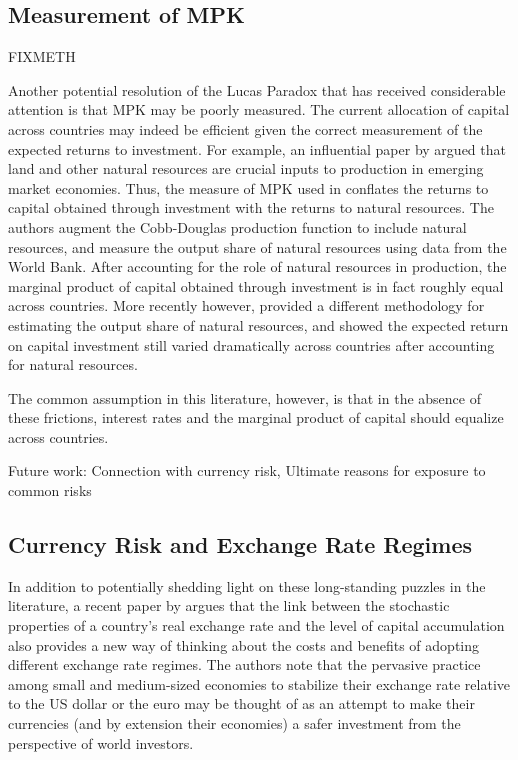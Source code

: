 \documentclass{ar-1col}
\begin{document}
\subsection{Measurement of MPK}

FIXMETH

Another potential resolution of the Lucas Paradox that has received considerable attention is that MPK may be poorly measured. The current allocation of capital across countries may indeed be efficient given the correct measurement of the expected returns to investment. For example, an influential paper by \citet{CaselliFeyrer2007} argued that land and other natural resources are crucial inputs to production in emerging market economies. Thus, the measure of MPK used in \citet{Lucas1990} conflates the returns to capital obtained through investment with the returns to natural resources. The authors augment the Cobb-Douglas production function to include natural resources, and measure the output share of natural resources using data from the World Bank. After accounting for the role of natural resources in production, the marginal product of capital obtained through investment is in fact roughly equal across countries. More recently however, \citet{Monge-Naranjoetal2019} provided a different methodology for estimating the output share of natural resources, and showed the expected return on capital investment still varied dramatically across countries after accounting for natural resources.

The common assumption in this literature, however, is that in the absence of these frictions, interest rates and the marginal product of capital should equalize across countries. 

Future work: Connection with currency risk, Ultimate reasons for exposure to common risks


\subsection{Currency Risk and Exchange Rate Regimes}

In addition to potentially shedding light on these long-standing puzzles in the literature, a recent paper by \citet{HassanMertensZhang2020} argues that the link between the stochastic properties of a country's real exchange rate and the level of capital accumulation also provides a new way of thinking about the costs and benefits of adopting different exchange rate regimes. The authors note that the pervasive practice among small and medium-sized economies to stabilize their exchange rate relative to the US dollar or the euro \citep{ilzetzki2018exchange} may be thought of as an attempt to make their currencies (and by extension their economies) a safer investment from the perspective of world investors. 
\end{document}
